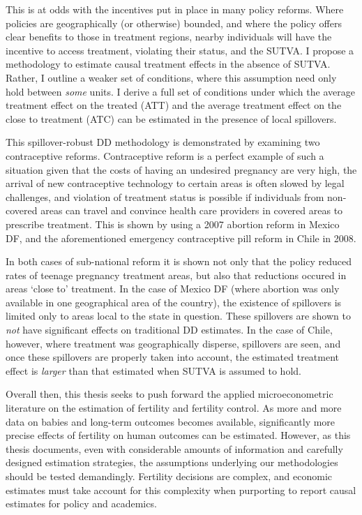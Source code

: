 This is at odds with the incentives put in place in many policy reforms. Where
policies are geographically (or otherwise) bounded, and where the policy offers
clear benefits to those in treatment regions, nearby individuals will have the
incentive to access treatment, violating their status, and the SUTVA. I propose
a methodology to estimate causal treatment effects in the absence of SUTVA.
Rather, I outline a weaker set of conditions, where this assumption need only 
hold between \emph{some} units.  I derive a full set of conditions under which 
the average treatment effect on the treated (ATT) and the average treatment 
effect on the close to treatment (ATC) can be estimated in the presence of
local spillovers.

This spillover-robust DD methodology is demonstrated by examining two 
contraceptive reforms.  Contraceptive reform is a perfect example of such a 
situation given that the costs of having an undesired pregnancy are very high, 
the arrival of new contraceptive technology to certain areas is often slowed by 
legal challenges, and violation of treatment status is possible if individuals 
from non-covered areas can travel and convince health care providers in covered 
areas to prescribe treatment.  This is shown by using a 2007 abortion reform in 
Mexico DF, and the aforementioned emergency contraceptive pill reform in Chile
in 2008.

In both cases of sub-national reform it is shown not only that the policy 
reduced rates of teenage pregnancy treatment areas, but also that reductions
occured in areas `close to' treatment.  In the case of Mexico DF (where 
abortion was only available in one geographical area of the country), the 
existence of spillovers is limited only to areas local to the state in question.
These spillovers are shown to \emph{not} have significant effects on traditional
DD estimates.  In the case of Chile, however, where treatment was geographically
disperse, spillovers are seen, and once these spillovers are properly taken into
account, the estimated treatment effect is \emph{larger} than that estimated 
when SUTVA is assumed to hold.

Overall then, this thesis seeks to push forward the applied microeconometric 
literature on the estimation of fertility and fertility control.  As more and
more data on babies and long-term outcomes becomes available, significantly
more precise effects of fertility on human outcomes can be estimated.  However,
as this thesis documents, even with considerable amounts of information and
carefully designed estimation strategies, the assumptions underlying our 
methodologies should be tested demandingly.  Fertility decisions are complex, 
and economic estimates must take account for this complexity when purporting to
report causal estimates for policy and academics.

